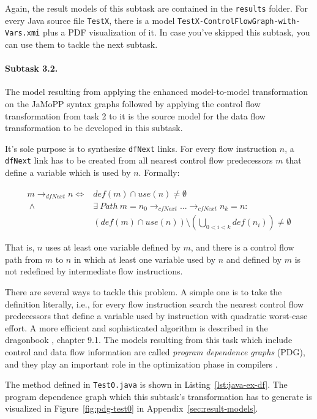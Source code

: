 \documentclass[11pt]{article}
\begin{document}
Again, the result models of this subtask are contained in the \verb|results|
folder.  For every Java source file \verb|TestX|, there is a model
\verb|TestX-ControlFlowGraph-with-Vars.xmi| plus a PDF visualization of it.  In
case you've skipped this subtask, you can use them to tackle the next subtask.

\paragraph{Subtask 3.2.}
\label{sec:subtask-3.2}

The model resulting from applying the enhanced model-to-model transformation on
the JaMoPP syntax graphs followed by applying the control flow transformation
from task 2 to it is the source model for the data flow transformation to be
developed in this subtask.

It's sole purpose is to synthesize \verb|dfNext| links.  For every flow
instruction $n$, a \verb|dfNext| link has to be created from all nearest
control flow predecessors $m$ that define a variable which is used by $n$.
Formally:

\begin{align*}
  m \rightarrow_{dfNext} n  \iff {} & def(m) \cap use(n) \neq \emptyset\\
  ~\land {} & \exists~Path~m = n_0 \rightarrow_{cfNext} ... \rightarrow_{cfNext} n_k = n:\\
  & \left(def(m) \cap use(n)\right) \setminus \left(\bigcup_{0 < i < k}
    def(n_i)\right) \neq \emptyset
\end{align*}

That is, $n$ uses at least one variable defined by $m$, and there is a control
flow path from $m$ to $n$ in which at least one variable used by $n$ and
defined by $m$ is not redefined by intermediate flow instructions.

There are several ways to tackle this problem.  A simple one is to take the
definition literally, i.e., for every flow instruction search the nearest
control flow predecessors that define a variable used by instruction with
quadratic worst-case effort.  A more efficient and sophisticated algorithm is
described in the dragonbook \cite{Aho:CPTT}, chapter 9.1.  The models resulting
from this task which include control and data flow information are called
\emph{program dependence graphs} (PDG), and they play an important role in the
optimization phase in compilers \cite{Ferrante:1987:PDG:24039.24041}.

The method defined in \verb|Test0.java| is shown in
Listing~\ref{lst:java-ex-df}.  The program dependence graph which this
subtask's transformation has to generate is visualized in
Figure~\ref{fig:pdg-test0} in Appendix~\ref{sec:result-models}.
\end{document}

